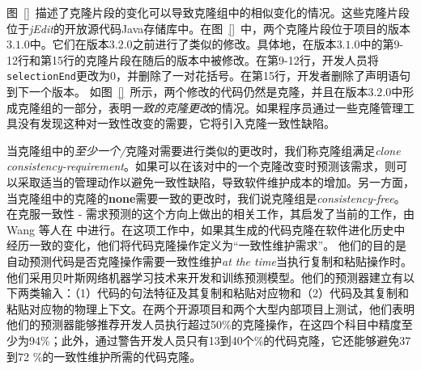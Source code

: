 图~\ref{}~描述了克隆片段的变化可以导致克隆组中的相似变化的情况。这些克隆片段位于{\em jEdit}的开放源代码Java存储库中。在图~\ref{}~中，两个克隆片段位于项目的版本$ 3.1.0 $中。它们在版本$ 3.2.0 $之前进行了类似的修改。具体地，在版本$ 3.1.0 $中的第9-12行和第15行的克隆片段在随后的版本中被修改。在第9-12行，开发人员将{\tt selectionEnd}更改为$ 0 $，并删除了一对花括号。在第15行，开发者删除了声明语句到下一个版本。
如图~\ref{}~所示，两个修改的代码仍然是克隆，并且在版本$ 3.2.0 $中形成克隆组的一部分，表明{\em 一致的克隆更改}的情况。如果程序员通过一些克隆管理工具没有发现这种对一致性改变的需要，它将引入克隆一致性缺陷。


\begin{figure}[htbp]
\centering
\subfigure{\label{cg1}}\addtocounter{subfigure}{-2}
\subfigure{\label{cg2}}\addtocounter{subfigure}{-2}
\vspace{-1em}
\end{figure}


当克隆组中的{\em 至少一个/}克隆对需要进行类似的更改时，我们称克隆组满足{\em clone consistency-requirement}。如果可以在该对中的一个克隆改变时预测该需求，则可以采取适当的管理动作以避免一致性缺陷，导致软件维护成本的增加。另一方面，当克隆组中的克隆的{\bf none}需要一致的更改时，我们说克隆组是{\em consistency-free}。在克服一致性 - 需求预测的这个方向上做出的相关工作，其启发了当前的工作，由Wang 等人在\cite{wang2012can} \cite{wang2014predicting}中进行。在这项工作中，如果其生成的代码克隆在软​​件进化历史中经历一致的变化，他们将代码克隆操作定义为“一致性维护需求”。
他们的目的是自动预测代码是否克隆操作需要一致性维护{\em at the time}当执行复制和粘贴操作时。他们采用贝叶斯网络机器学习技术来开发和训练预测模型\cite{friedman1997bayesian}。他们的预测器建立有以下两类输入：（1）代码的句法特征及其复制和粘贴对应物和（2）代码及其复制和粘贴对应物的物理上下文。在两个开源项目和两个大型内部项目上测试，他们表明他们的预测器能够推荐开发人员执行超过50\%的克隆操作，在这四个科目中精度至少为94\%；此外，通过警告开发人员只有13到40个\%的代码克隆，它还能够避免37到72 \%的一致性维护所需的代码克隆。

